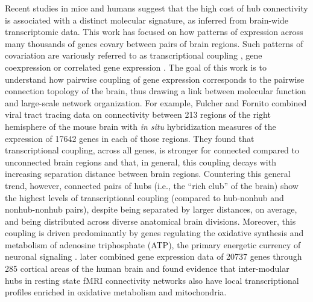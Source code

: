 Recent studies in mice and humans suggest that the high cost of hub connectivity is associated with a distinct
molecular signature, as inferred from brain-wide transcriptomic data.
This work has focused on how patterns of expression across many thousands of genes covary between pairs of brain regions.
Such patterns of covariation are variously referred to as transcriptional coupling \citep{Fulcher2016}, gene coexpression \citep{Krienen2016} or correlated gene expression \citep{Richiardi2015, Mills2018, Goel2014}.
The goal of this work is to understand how pairwise coupling of gene expression corresponds to the pairwise connection topology of the brain, thus drawing a link between molecular function and large-scale network organization.
For example, Fulcher and Fornito \citep{Fulcher2016} combined viral tract tracing data on connectivity between 213 regions of the right hemisphere of the mouse brain \citep{Oh2014} with \emph{in situ} hybridization measures of the expression of \num{17642} genes in each of those regions.
They found that transcriptional coupling, across all genes, is stronger for connected compared to unconnected brain regions and that, in general, this coupling decays with increasing separation distance between brain regions.
Countering this general trend, however, connected pairs of hubs (i.e., the ``rich club'' of the brain) show the highest levels of transcriptional coupling (compared to hub-nonhub and nonhub-nonhub pairs), despite being separated by larger distances, on average, and being distributed across diverse anatomical brain divisions.
Moreover, this coupling is driven predominantly by genes regulating the oxidative synthesis and metabolism of adenosine triphosphate (ATP), the primary energetic currency of neuronal signaling \citep{Lennie2003, Laughlin2003}. \mbox{\citet{Vertes2016b}} later combined gene expression data of \num{20737} genes through 285 cortical areas of the human brain and found evidence that inter-modular hubs in resting state fMRI connectivity networks also have local transcriptional profiles enriched in oxidative metabolism and mitochondria.

